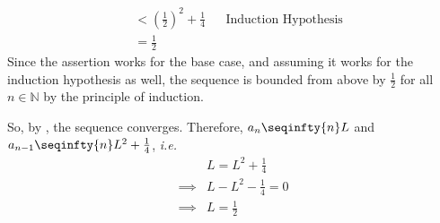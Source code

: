 \begin{exm}
\begin{flushleft}
\begin{flushleft}
\begin{align*}
				        & < \left(\frac{1}{2}\right)^2 + \frac{1}{4} &  & \text{Induction Hypothesis} \\
				        & = \frac{1}{2}
			\end{align*}
			Since the assertion works for the base case, and assuming it works for the
			induction hypothesis as well, the sequence is bounded from above by $\tfrac{1}{2}$
			for all $n\in\mathbb{N}$ by the principle of induction.
		\end{flushleft}
		So, by , the sequence
		converges. Therefore, $a_n \seqinfty{n} L$ and $a_{n-1} \seqinfty{n} L^2+\tfrac{1}{4}$, \textit{i.e.}
		\begin{align*}
			 & L = L^2 + \frac{1}{4}   \\
			\implies
			 & L - L^2 - \frac{1}{4}=0 \\
			\implies
			 & L=\frac{1}{2}
		\end{align*}
	\end{flushleft}
\end{exm}

